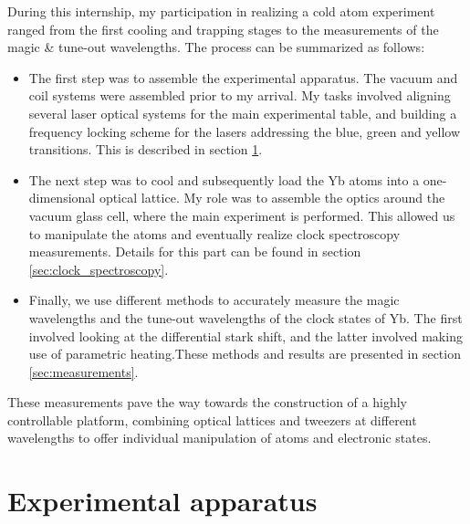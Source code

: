 \documentclass[11pt]{article}
\newenvironment{myblock}[1]{%
    \tcolorbox[%
    colback=color1,colframe=color1,%
    title=#1]}%
    {\endtcolorbox}
\numberwithin{equation}{section}
\numberwithin{figure}{section}
\begin{document}
\begin{myblock}{}
During this internship, my participation in realizing a cold atom experiment ranged from the first cooling and trapping stages to the measurements of the magic \& tune-out wavelengths. The process can be summarized as follows:
%
\begin{itemize}
	\item The first step was to assemble the experimental apparatus. The vacuum and coil systems were assembled prior to my arrival. My tasks involved aligning several laser optical systems for the main experimental table, and building a frequency locking scheme for the lasers addressing the blue, green and yellow transitions. This is described in section \ref{sec:experiment}.
	\item The next step was to cool and subsequently load the Yb atoms into a one-dimensional optical lattice. My role was to assemble the optics around the vacuum glass cell, where the main experiment is performed. This allowed us to manipulate the atoms and eventually realize clock spectroscopy measurements. Details for this  part can be found in section \ref{sec:clock_spectroscopy}.
	\item Finally, we use different methods to accurately measure the magic wavelengths and the tune-out wavelengths of the clock states of Yb. The first involved looking at the differential stark shift, and the latter involved making use of parametric heating.These methods and results are presented in section \ref{sec:measurements}.
\end{itemize}
%

These measurements pave the way towards the construction of a highly controllable platform, combining optical lattices and tweezers at different wavelengths to offer individual manipulation of atoms and electronic states. 

\end{myblock}


\section{Experimental apparatus}
\label{sec:experiment}
\end{document}

